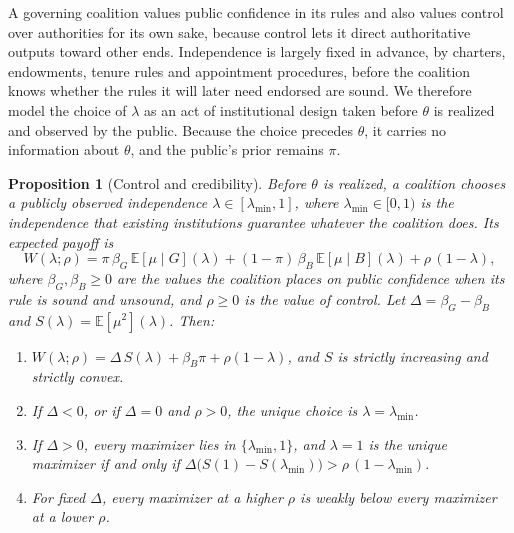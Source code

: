 \documentclass[11pt,letterpaper]{article}
\newtheorem{proposition}[theorem]{Proposition}
\theoremstyle{definition}
\theoremstyle{remark}
\newcommand{\E}{\mathbb{E}}
\begin{document}
A governing coalition values public confidence in its rules and also values control over authorities for its own sake, because control lets it direct authoritative outputs toward other ends. Independence is largely fixed in advance, by charters, endowments, tenure rules and appointment procedures, before the coalition knows whether the rules it will later need endorsed are sound. We therefore model the choice of $\lambda$ as an act of institutional design taken before $\theta$ is realized and observed by the public. Because the choice precedes $\theta$, it carries no information about $\theta$, and the public's prior remains $\pi$.

\begin{proposition}[Control and credibility]
\label{prop:ideological-power:tradeoff}
Before $\theta$ is realized, a coalition chooses a publicly observed independence $\lambda\in[\lambda_{\min},1]$, where $\lambda_{\min}\in[0,1)$ is the independence that existing institutions guarantee whatever the coalition does. Its expected payoff is
\[
W(\lambda;\rho)=\pi\,\beta_G\,\E[\mu\mid G](\lambda)+(1-\pi)\,\beta_B\,\E[\mu\mid B](\lambda)+\rho\,(1-\lambda),
\]
where $\beta_G,\beta_B\geq0$ are the values the coalition places on public confidence when its rule is sound and unsound, and $\rho\geq0$ is the value of control. Let $\Delta=\beta_G-\beta_B$ and $S(\lambda)=\E[\mu^2](\lambda)$. Then:
\begin{enumerate}
\item[(a)] $W(\lambda;\rho)=\Delta\,S(\lambda)+\beta_B\pi+\rho(1-\lambda)$, and $S$ is strictly increasing and strictly convex.
\item[(b)] If $\Delta<0$, or if $\Delta=0$ and $\rho>0$, the unique choice is $\lambda=\lambda_{\min}$.
\item[(c)] If $\Delta>0$, every maximizer lies in $\{\lambda_{\min},1\}$, and $\lambda=1$ is the unique maximizer if and only if $\Delta\bigl(S(1)-S(\lambda_{\min})\bigr)>\rho\,(1-\lambda_{\min})$.
\item[(d)] For fixed $\Delta$, every maximizer at a higher $\rho$ is weakly below every maximizer at a lower $\rho$.
\end{enumerate}
\end{proposition}
\end{document}
